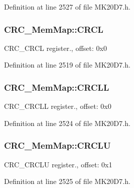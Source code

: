 Definition at line 2527 of file M\+K20\+D7.\+h.

\subsubsection[{\texorpdfstring{C\+R\+CL}{CRCL}}]{ C\+R\+C\+\_\+\+Mem\+Map\+::\+C\+R\+CL}\hypertarget{struct_c_r_c___mem_map_ae22498ebf770ee808517eb8c70208759}{}\label{struct_c_r_c___mem_map_ae22498ebf770ee808517eb8c70208759}
C\+R\+C\+\_\+\+C\+R\+CL register., offset\+: 0x0 

Definition at line 2519 of file M\+K20\+D7.\+h.

\subsubsection[{\texorpdfstring{C\+R\+C\+LL}{CRCLL}}]{ C\+R\+C\+\_\+\+Mem\+Map\+::\+C\+R\+C\+LL}\hypertarget{struct_c_r_c___mem_map_a67b4eb3ac1b5f1129cfbc0ba848db17f}{}\label{struct_c_r_c___mem_map_a67b4eb3ac1b5f1129cfbc0ba848db17f}
C\+R\+C\+\_\+\+C\+R\+C\+LL register., offset\+: 0x0 

Definition at line 2524 of file M\+K20\+D7.\+h.

\subsubsection[{\texorpdfstring{C\+R\+C\+LU}{CRCLU}}]{ C\+R\+C\+\_\+\+Mem\+Map\+::\+C\+R\+C\+LU}\hypertarget{struct_c_r_c___mem_map_a5bd8cdac1a017e655a8e9dbb382ce981}{}\label{struct_c_r_c___mem_map_a5bd8cdac1a017e655a8e9dbb382ce981}
C\+R\+C\+\_\+\+C\+R\+C\+LU register., offset\+: 0x1 

Definition at line 2525 of file M\+K20\+D7.\+h.

